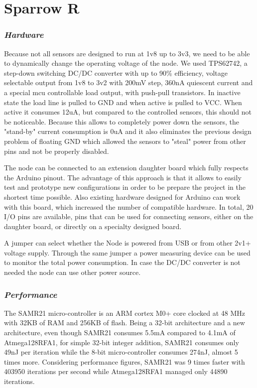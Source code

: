 \normalfont\normalsize
\chapter{Sparrow R}


\subsection{\textit{Hardware}}
Because not all sensors are designed to run at 1v8 up to 3v3, we need to be able to dynamically
change the operating voltage of the node. We used TPS62742, a step-down switching DC/DC converter
with up to 90\% efficiency, voltage selectable output from 1v8 to 3v2 with 200mV step, 360nA
quiescent current and a special mcu controllable load output, with push-pull transistors. In
inactive state the load line is pulled to GND and when active is pulled to VCC. When active it
consumes 12uA, but compared to the controlled sensors, this should not be noticeable. Because this
allows to completely power down the sensors, the "stand-by" current consumption is 0uA and it also
eliminates the previous design problem of floating GND which allowed the sensors to "steal" power
from other pins and not be properly disabled.

The node can be connected to an extension daughter board which fully respects the Arduino pinout.
The advantage of this approach is that it allows to easily test and prototype new configurations in
order to be prepare the project in the shortest time possible. Also existing hardware designed for Arduino can work with this board,
which increased the number of compatible hardware. In total, 20 I/O pins are available, pins that
can be used for connecting sensors, either on the daughter board, or directly on a specialty
designed board.

A jumper can select whether the Node is powered from USB or from other 2v1+ voltage supply. Through
the same jumper a power measuring device can be used to monitor the total power consumption. In case the DC/DC converter is not
needed the node can use other power source.

\subsection{\textit{Performance}}

The SAMR21\cite{samr21} micro-controller is an ARM cortex M0+ core clocked at 48 MHz with 32KB of RAM and 256KB
of flash. Being a 32-bit architecture and a new architecture, even though SAMR21 consumes 5.5mA
compared to 4.1mA of Atmega128RFA1, for simple 32-bit integer addition, SAMR21 consumes only 49nJ
per iteration while the 8-bit micro-controller consumes 274nJ, almost 5 times more. Considering
performance figures, SAMR21 was 9 times faster with 403950 iterations per second while
Atmega128RFA1 managed only 44890 iterations.

